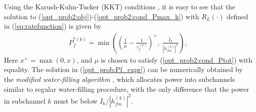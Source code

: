 \documentclass[journal,final,letterpaper,10pt,doublecolumn,twoside]{IEEEtran}
\begin{document}
Using the Karush-Kuhn-Tucker (KKT) conditions \cite{ConvexOptimization_textbook},   it is easy to see that the solution to (\ref{opt_prob2:obj})-(\ref{opt_prob2:cond_Pmax_k}) with $R_L(\cdot)$ defined in (\ref{eq:ratefunction}) is given by
\begin{eqnarray}
 P_f^{*(k)} =  \min \left( \left(\frac{1}{\mu}  - \frac{1}{\gamma_f^{(k)}}   \right)^+,  ~\frac{\bar{I}_k}{|h_{fm}^{(k)}|^2} \right)  , \label{opt_prob:Pf_expr}
\end{eqnarray}
Here $x^+ = \max(0,x)$, and $\mu$ is chosen to satisfy (\ref{opt_prob2:cond_Ptot}) with equality.
The solution in (\ref{opt_prob:Pf_expr}) can be numerically obtained by the \emph{modified water-filling algorithm} \cite{cap-limited-water-filling-wcnc2009}\cite{cap-limited-water-filling-EURASIP2008},  which allocates power into subchannels similar to regular water-filling procedure, with the only difference that the power in subchannel $k$ must be below $\bar{I}_k / |h_{fm}^{(k)}|^2$.
\end{document}
